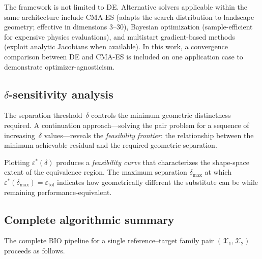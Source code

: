 The framework is not limited to DE. Alternative solvers applicable within the same architecture include CMA-ES (adapts the search distribution to landscape geometry; effective in dimensions 3--30), Bayesian optimization (sample-efficient for expensive physics evaluations), and multistart gradient-based methods (exploit analytic Jacobians when available). In this work, a convergence comparison between DE and CMA-ES is included on one application case to demonstrate optimizer-agnosticism.


\subsection{$\delta$-sensitivity analysis}
\label{sec:delta_sensitivity}

The separation threshold~$\delta$ controls the minimum geometric distinctness required. A continuation approach---solving the pair problem for a sequence of increasing~$\delta$ values---reveals the \emph{feasibility frontier}: the relationship between the minimum achievable residual and the required geometric separation.

Plotting $\varepsilon^*(\delta)$ produces a \emph{feasibility curve} that characterizes the shape-space extent of the equivalence region. The maximum separation $\delta_{\max}$ at which $\varepsilon^*(\delta_{\max}) = \varepsilon_{\mathrm{tol}}$ indicates how geometrically different the substitute can be while remaining performance-equivalent.


\subsection{Complete algorithmic summary}
\label{sec:algorithm_summary}

The complete BIO pipeline for a single reference--target family pair $(\mathcal{X}_1, \mathcal{X}_2)$ proceeds as follows.

